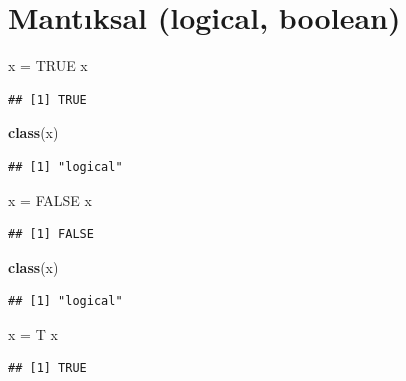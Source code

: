 \documentclass[
]{book}
\newenvironment{Shaded}{\begin{snugshade}}{\end{snugshade}}
\newcommand{\KeywordTok}[1]{\textcolor[rgb]{0.13,0.29,0.53}{\textbf{#1}}}
\newcommand{\NormalTok}[1]{#1}
\newcommand{\OtherTok}[1]{\textcolor[rgb]{0.56,0.35,0.01}{#1}}
\newcommand{\StringTok}[1]{\textcolor[rgb]{0.31,0.60,0.02}{#1}}
\begin{document}
\hypertarget{mantux131ksal-logical-boolean}{%
\section{Mantıksal (logical, boolean)}\label{mantux131ksal-logical-boolean}}

\begin{Shaded}
\begin{Highlighting}[]
\NormalTok{x =}\StringTok{ }\OtherTok{TRUE}
\NormalTok{x}
\end{Highlighting}
\end{Shaded}

\begin{verbatim}
## [1] TRUE
\end{verbatim}

\begin{Shaded}
\begin{Highlighting}[]
\KeywordTok{class}\NormalTok{(x)}
\end{Highlighting}
\end{Shaded}

\begin{verbatim}
## [1] "logical"
\end{verbatim}

\begin{Shaded}
\begin{Highlighting}[]
\NormalTok{x =}\StringTok{ }\OtherTok{FALSE}
\NormalTok{x}
\end{Highlighting}
\end{Shaded}

\begin{verbatim}
## [1] FALSE
\end{verbatim}

\begin{Shaded}
\begin{Highlighting}[]
\KeywordTok{class}\NormalTok{(x)}
\end{Highlighting}
\end{Shaded}

\begin{verbatim}
## [1] "logical"
\end{verbatim}

\begin{Shaded}
\begin{Highlighting}[]
\NormalTok{x =}\StringTok{ }\NormalTok{T}
\NormalTok{x}
\end{Highlighting}
\end{Shaded}

\begin{verbatim}
## [1] TRUE
\end{verbatim}
\end{document}
